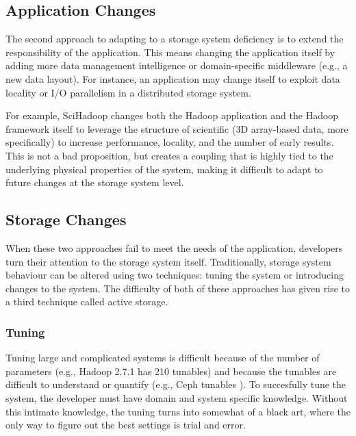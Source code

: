 \documentclass[10pt,twocolumn]{article}
\begin{document}
\subsection{Application Changes}\label{application-changes}

The second approach to adapting to a storage system deficiency is to
extend the responsibility of the application. This means changing the
application itself by adding more data management intelligence or
domain-specific middleware (e.g., a new data layout). For instance, an
application may change itself to exploit data locality or I/O
parallelism in a distributed storage system.

For example, SciHadoop \autocites[
]{buck:hpc2011-scihadoop}{buck:sc2013-scidr} changes both the Hadoop
application and the Hadoop framework itself to leverage the structure of
scientific (3D array-based data, more specifically) to increase
performance, locality, and the number of early results. This is not a
bad proposition, but creates a coupling that is highly tied to the
underlying physical properties of the system, making it difficult to
adapt to future changes at the storage system level.

\subsection{Storage Changes}\label{storage-changes}

When these two approaches fail to meet the needs of the application,
developers turn their attention to the storage system itself.
Traditionally, storage system behaviour can be altered using two
techniques: tuning the system or introducing changes to the system. The
difficulty of both of these approaches has given rise to a third
technique called active storage.

\subsubsection{Tuning}\label{tuning}

Tuning large and complicated systems is difficult because of the number
of parameters (e.g., Hadoop 2.7.1 has 210 tunables) and because the
tunables are difficult to understand or quantify (e.g., Ceph tunables
\autocite{sevilla:sc15-mantle}). To succesfully tune the system, the
developer must have domain and system specific knowledge. Without this
intimate knowledge, the tuning turns into somewhat of a black art, where
the only way to figure out the best settings is trial and error.
\end{document}
